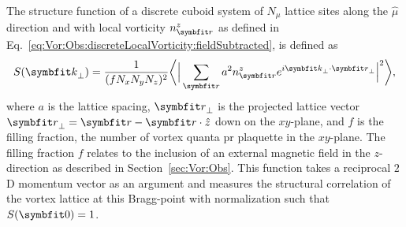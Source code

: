 The structure function of a discrete cuboid system of $N_\mu$ lattice sites along the $\hat{\mu}$ direction and with local vorticity $n^z_\v{r}$
as defined in Eq.~\eqref{eq:Vor:Obs:discreteLocalVorticity:fieldSubtracted}, is defined as 
\begin{equation}
    \label{eq:Vor:Symm:SF:def}
    S(\v{k}_\perp) = \frac{1}{(fN_xN_yN_z)^2}\bigg\langle\Big|\sum_\v{r}a^2n^z_\v{r}e^{i\v{k}_\perp\cdot\v{r}_\perp}\Big|^2\bigg\rangle,
\end{equation}
where $a$ is the lattice spacing, $\v{r}_\perp$ is the projected lattice vector $\v{r}_\perp = \v{r}-\v{r}\cdot\hat{z}$ down on the $xy$-plane, and $f$ is the filling fraction, \ie the number
of vortex quanta pr plaquette in the $xy$-plane. The filling fraction $f$ relates to the inclusion of an external magnetic field in the $z$-direction as described in Section~\ref{sec:Vor:Obs}.
This function takes a reciprocal $2$D momentum vector as an argument and measures the structural correlation of the vortex lattice at this Bragg-point with normalization such that
$S(\v{0})=1$.

